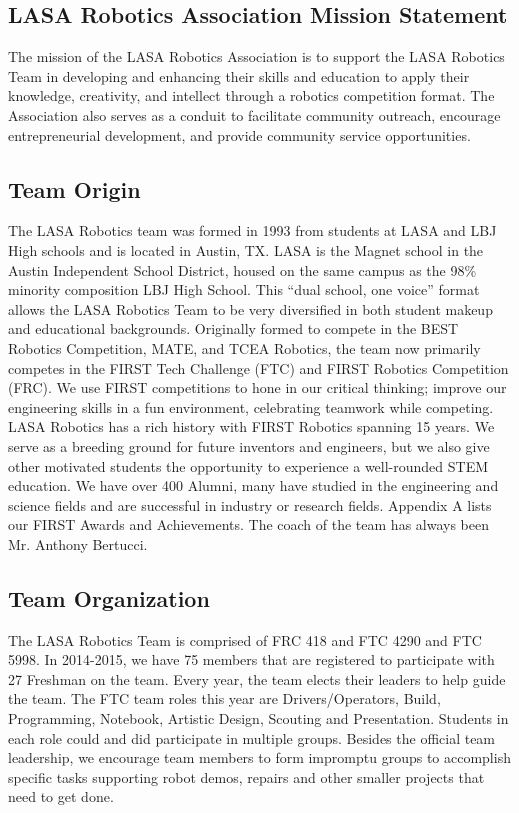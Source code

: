 \subsection{LASA Robotics Association Mission Statement}
The mission of the LASA Robotics Association is to support the LASA Robotics Team in developing and enhancing their skills and education to apply their knowledge, creativity, and intellect through a robotics competition format. The Association also serves as a conduit to facilitate community outreach, encourage entrepreneurial development, and provide community service opportunities.

\subsection{Team Origin}
The LASA Robotics team was formed in 1993 from students at LASA and LBJ High schools and is located in Austin, TX. LASA is the Magnet school in the Austin Independent School District, housed on the same campus as the 98\% minority composition LBJ High School. This “dual school, one voice” format allows the LASA Robotics Team to be very diversified in both student makeup and educational backgrounds.   Originally formed to compete in the BEST Robotics Competition, MATE, and TCEA Robotics, the team now primarily competes in the FIRST Tech Challenge (FTC) and FIRST Robotics Competition (FRC).  We use FIRST competitions to hone in our critical thinking; improve our engineering skills in a fun environment, celebrating teamwork while competing.\\

LASA Robotics has a rich history with FIRST Robotics spanning 15 years. We serve as a breeding ground for future inventors and engineers, but we also give other motivated students the opportunity to experience a well-rounded STEM education. We have over 400 Alumni, many have studied in the engineering and science fields and are successful in industry or research fields. Appendix A lists our FIRST Awards and Achievements.   The coach of the team has always been Mr. Anthony Bertucci.\\

\subsection{Team Organization}
The LASA Robotics Team is comprised of FRC 418 and FTC 4290 and FTC 5998.  In 2014-2015, we have 75 members that are registered to participate with 27 Freshman on the team.  Every year, the team elects their leaders to help guide the team.  The FTC team roles this year are Drivers/Operators, Build, Programming, Notebook, Artistic Design, Scouting and Presentation.  Students in each role could and did participate in multiple groups.  Besides the official team leadership, we encourage team members to form impromptu groups to accomplish specific tasks supporting robot demos, repairs and other smaller projects that need to get done.\\

